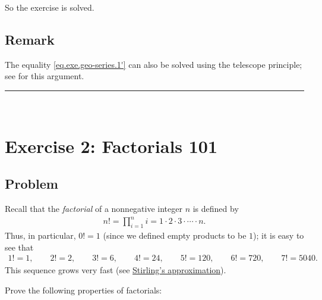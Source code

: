 \documentclass[paper=a4, fontsize=12pt]{scrartcl} %
\newcommand{\horrule}[1]{\rule{\linewidth}{#1}} %
\let\prodnonlimits\prod
\renewcommand{\prod}{\prodnonlimits\limits}
\theoremstyle{plainsl}
\theoremstyle{definition}
\theoremstyle{remark}
\begin{document}
So the exercise is solved.

\subsection{Remark}

The equality \eqref{eq.exe.geo-series.1'} can also be solved using
the telescope principle; see \cite[(18)]{detnotes} for this
argument.

\horrule{0.3pt} \\[0.4cm]

\section{Exercise 2: Factorials 101}

\subsection{Problem}

Recall that the \textit{factorial} of a nonnegative integer $n$
is defined by
\begin{align*}
n! = \prod_{i=1}^n i = 1 \cdot 2 \cdot 3 \cdot \cdots \cdot n .
\end{align*}
Thus, in particular, $0! = 1$ (since we defined empty products
to be $1$); it is easy to see that
\begin{align*}
1! = 1, \qquad
2! = 2, \qquad
3! = 6, \qquad
4! = 24, \qquad
5! = 120, \qquad
6! = 720, \qquad
7! = 5040.
\end{align*}
This sequence grows very fast (see
\href{https://en.wikipedia.org/wiki/Stirling%27s_approximation}{Stirling's approximation}).

Prove the following properties of factorials:
\end{document}

